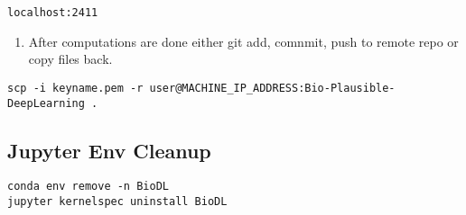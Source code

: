 \begin{verbatim}
localhost:2411
\end{verbatim}

\begin{enumerate}
\def\labelenumi{\arabic{enumi}.}
\setcounter{enumi}{4}
\tightlist
\item
  After computations are done either git add, comnmit, push to remote
  repo or copy files back.
\end{enumerate}

\begin{verbatim}
scp -i keyname.pem -r user@MACHINE_IP_ADDRESS:Bio-Plausible-DeepLearning .
\end{verbatim}

\hypertarget{jupyter-env-cleanup}{%
\subsection*{Jupyter Env Cleanup}\label{jupyter-env-cleanup}}

\begin{verbatim}
conda env remove -n BioDL
jupyter kernelspec uninstall BioDL
\end{verbatim}
